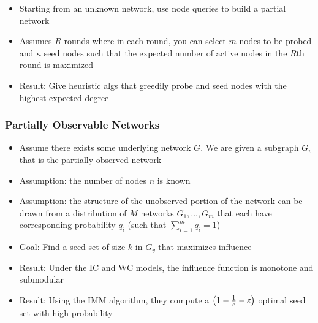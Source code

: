 
 
\begin{itemize}[label=--]
    \itemsep0em 
    \item Starting from an unknown network, use node queries to build a partial network
    \item Assumes $R$ rounds where in each round, you can select $m$ nodes to be probed and $\kappa$ seed nodes
    such that the expected number of active nodes in the $R$th round is maximized
    \item Result: Give heuristic algs that greedily probe and seed nodes with the highest expected degree 
\end{itemize}

\subsubsection{Partially Observable Networks}

\begin{itemize}[label=--]
    \itemsep0em 
    \item Assume there exists some underlying network $G$. We are given a subgraph $G_v$ that is the partially observed network
    \item Assumption: the number of nodes $n$ is known
    \item Assumption: the structure of the unobserved portion of the network can be drawn from a distribution of $M$ networks 
    $G_1, \ldots, G_m$ that each have corresponding probability $q_i$ (such that $\sum_{i=1}^{m} q_i = 1$) 
    \item Goal: Find a seed set of size $k$ in $G_v$ that maximizes influence
    \item Result: Under the IC and WC models, the influence function is monotone and submodular
    \item Result: Using the IMM algorithm, they compute a $\left( 1 - \frac{1}{e} - \varepsilon \right)$ optimal seed set with high probability 
\end{itemize}


